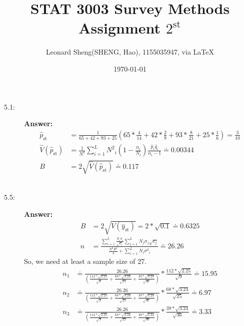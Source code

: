 \documentclass{article}
\begin{document}
\title{STAT 3003 Survey Methods \\Assignment $2^{\text{st}}$}
\author{{\normalsize Leonard Sheng(SHENG, Hao), 1155035947, via \LaTeX}}
\date{\today}

\maketitle

\def \Pr{{\rm Pr}}

\baselineskip 0.6cm
\begin{description}
    \item[5.1:]{\bf Answer:}\\
        \begin{align}
        \hat{p}_{\text{st}}&=\frac{1}{65+42+93+25}\left(65*\frac{4}{14}+42*\frac{2}{9}+93*\frac{8}{21}+25*\frac{1}{6}\right)=\frac{3}{10}\\
        \hat{V}\left(\hat{p}_{\text{st}}\right)&=\frac{1}{N^2}\sum _{i=1}^L N^2{}_i\left(1-\frac{n_i}{N_i}\right)\frac{\hat{p}_i\hat{q}_i}{n_i-1}\doteq 0.00344\\
        B&=2\sqrt{\hat{V}\left(\hat{p}_{\text{st}}\right)}\doteq 0.117
        \end{align}\\
    \item[5.5:]{\bf Answer:}\\
        \begin{align}
          B&=2\sqrt{V\left(\overset{-}{y}_{\text{st}}\right)}=2*\sqrt{0.1}\doteq 0.6325\\
          n&=\frac{\sum _{i=1}^L \frac{N_i\sigma _i}{\sqrt{c_i}}\sum _{j=1}^L N_j\sigma _j\sqrt{c_j}}{\frac{N^2B^2}{4}+\sum _{i=1}^L N_i\sigma ^2{}_i}\doteq 26.26
        \end{align}
        So, we need at least a sample size of 27.
        \begin{align}
          n_1&\doteq \frac{26.26}{\left(\frac{112*\sqrt{2.25}}{\sqrt{9}}+\frac{68*\sqrt{3.24}}{\sqrt{25}}+\frac{39*\sqrt{3.24}}{\sqrt{36}}\right)}*\frac{112*\sqrt{2.25}}{\sqrt{9}}\doteq 15.95\\
          n_2&\doteq \frac{26.26}{\left(\frac{112*\sqrt{2.25}}{\sqrt{9}}+\frac{68*\sqrt{3.24}}{\sqrt{25}}+\frac{39*\sqrt{3.24}}{\sqrt{36}}\right)}*\frac{68*\sqrt{3.24}}{\sqrt{25}}\doteq 6.97\\
          n_3&\doteq \frac{26.26}{\left(\frac{112*\sqrt{2.25}}{\sqrt{9}}+\frac{68*\sqrt{3.24}}{\sqrt{25}}+\frac{39*\sqrt{3.24}}{\sqrt{36}}\right)}*\frac{39*\sqrt{3.24}}{\sqrt{36}}\doteq 3.33

\end{align}
\end{description}
\end{document}
